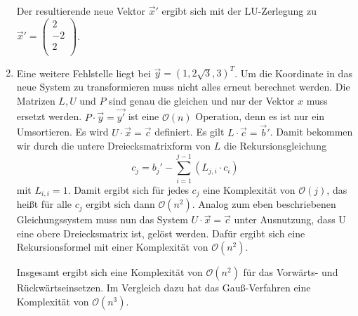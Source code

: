 \begin{enumerate}[label=\alph*)]
Der resultierende neue Vektor $\vec x'$ ergibt sich mit der LU-Zerlegung zu
$\vec x' = \begin{pmatrix}
2\\
-2\\
2\\
\end{pmatrix}$.

\item Eine weitere Fehlstelle liegt bei $\vec y = (1, 2\sqrt{3}, 3)^T$. Um die Koordinate in das neue System zu transformieren muss nicht alles erneut berechnet werden. Die Matrizen $L, U$ und $P$ sind genau die gleichen und nur der Vektor $x$ muss ersetzt werden.
$P \cdot \vec y = \vec {y'}$ ist eine $\mathcal{O}(n)$ Operation, denn es ist nur ein Umsortieren. Es wird $U \cdot \vec x = \vec c$ definiert. Es gilt $L \cdot \vec c = \vec b'$. Damit bekommen wir durch die untere Dreiecksmatrixform von $L$ die Rekursionsgleichung \begin{equation*}
    c_j = b_j' - \sum_{i = 1}^{j-1} (L_{j, i} \cdot c_i)
\end{equation*} 
mit $L_{i,i} = 1$. 
Damit ergibt sich für jedes $c_j$ eine Komplexität von $\mathcal{O}(j)$, das heißt für alle $c_j$ ergibt sich dann $\mathcal{O}(n^2)$. Analog zum eben beschriebenen Gleichungssystem muss nun das System $U \cdot \vec x = \vec c$ unter Ausnutzung, dass U eine obere Dreiecksmatrix ist, gelöst werden. Dafür ergibt sich eine Rekursionsformel mit einer Komplexität von $\mathcal{O}(n^2)$.

Insgesamt ergibt sich eine Komplexität von $\mathcal{O}(n^2)$ für das Vorwärts- und Rückwärtseinsetzen. Im Vergleich dazu hat das Gauß-Verfahren eine Komplexität von $\mathcal{O}(n^3)$.


\end{enumerate}
